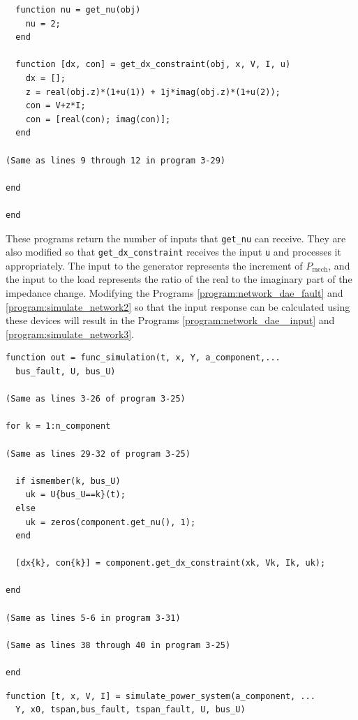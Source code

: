 \documentclass[tombow,dvipdfmx]{corona-a5-1.1}
\begin{document}
\begin{例}
\begin{PROGRAMA}[count,title={load\_impedance.m}]
\begin{verbatim}
  function nu = get_nu(obj)
    nu = 2;
  end

  function [dx, con] = get_dx_constraint(obj, x, V, I, u)
    dx = [];
    z = real(obj.z)*(1+u(1)) + 1j*imag(obj.z)*(1+u(2));
    con = V+z*I;
    con = [real(con); imag(con)];
  end

(Same as lines 9 through 12 in program 3-29)

end

end
\end{verbatim}
\end{PROGRAMA}

These programs return the number of inputs that \verb|get_nu| can receive. They are also modified so that \verb|get_dx_constraint| receives the input \verb|u| and processes it appropriately.
The input to the generator represents the increment of $P_\mathrm{mech}$, and the input to the load represents the ratio of the real to the imaginary part of the impedance change.
Modifying the Programs \ref{program:network_dae_fault} and \ref{program:simulate_network2} so that the input response can be calculated using these devices will result in the Programs \ref{program:network_dae_ input} and \ref{program:simulate_network3}.

\smallskip
\begin{PROGRAMA}[count,title={func\_simulation.m}]\label{program:network_dae_input}
\begin{verbatim}
function out = func_simulation(t, x, Y, a_component,...
  bus_fault, U, bus_U)

(Same as lines 3-26 of program 3-25)

for k = 1:n_component

(Same as lines 29-32 of program 3-25)
  
  if ismember(k, bus_U)
    uk = U{bus_U==k}(t);
  else
    uk = zeros(component.get_nu(), 1);
  end
  
  [dx{k}, con{k}] = component.get_dx_constraint(xk, Vk, Ik, uk);
  
end

(Same as lines 5-6 in program 3-31)

(Same as lines 38 through 40 in program 3-25)

end
\end{verbatim}
\end{PROGRAMA}

\begin{PROGRAMA}[count,title={simulate\_power\_system.m}]\label{program:simulate_network3}
\begin{verbatim}
function [t, x, V, I] = simulate_power_system(a_component, ...
  Y, x0, tspan,bus_fault, tspan_fault, U, bus_U)


\end{verbatim}
\end{PROGRAMA}
\end{例}
\end{document}
